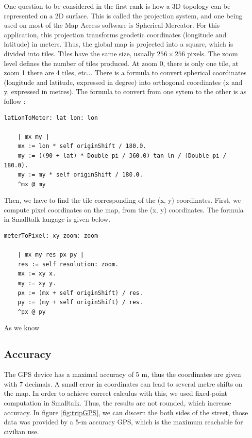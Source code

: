 One question to be considered in the first rank is how a 3D topology can be represented 
on a 2D surface. This is called the projection system, and one being used on most of the 
Map Access software is Spherical Mercator. 
For this application, this projection transforms geodetic coordinates (longitude and latitude) 
in meters. Thus, the global map is projected into a square, which is divided into tiles. 
Tiles have the same size, usually $256 \times 256$ pixels. 
The zoom level defines the number of tiles produced. 
At zoom 0, there is only one tile, at zoom 1 there are 4 tiles, etc... 
There is a formula to convert spherical coordinates (longitude and latitude, expressed in degree) 
into orthogonal coordinates (x and y, expressed in metres). 
The formula to convert from one sytem to the other is as follow :

\begin{lstlisting}
latLonToMeter: lat lon: lon

	| mx my |
	mx := lon * self originShift / 180.0.
	my := ((90 + lat) * Double pi / 360.0) tan ln / (Double pi / 180.0).
	my := my * self originShift / 180.0.
	^mx @ my
\end{lstlisting}

Then, we have to find the tile corresponding of the (x, y) coordinates. 
First, we compute pixel coordinates on the map, from the (x, y) coordinates. 
The formula in Smalltalk langage is given below. 

\begin{lstlisting}
meterToPixel: xy zoom: zoom

	| mx my res px py |
	res := self resolution: zoom.
	mx := xy x.
	my := xy y.
	px := (mx + self originShift) / res.
	py := (my + self originShift) / res.
	^px @ py
\end{lstlisting}

As we know 

\subsection{Accuracy}

The GPS device has a maximal accuracy of 5 m, thus the coordinates are given with 7 decimals. 
A small error in coordinates can lead to several metre shifts on the map.   
In order to achieve correct calculus with this, we used fixed-point computation in Smalltalk. 
Thus, the results are not rounded, which increase accuracy. 
In figure \ref{fig:tripGPS}, we can discern the both sides of the street, 
those data was provided by a 5-m accuracy GPS, which is the maximum reachable for civilian use. 

